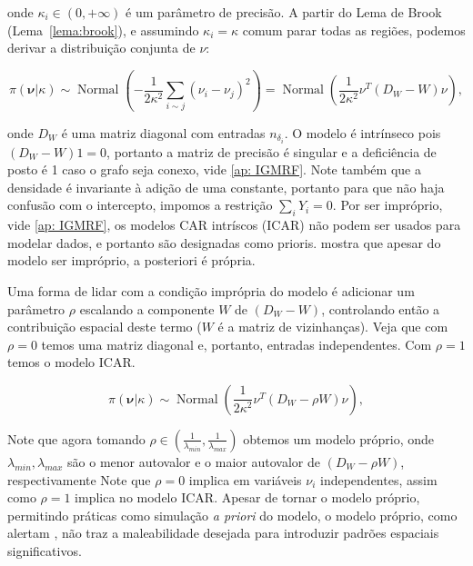 onde $\kappa_i \in (0,+\infty)$ é um parâmetro de precisão.
A partir do Lema de Brook (Lema~\autoref{lema:brook}), e assumindo $\kappa_i = \kappa$ comum parar todas as regiões, podemos derivar a distribuição conjunta de $\nu$:

\begin{equation}
\label{eq: full conditional}
    \pi(\boldsymbol{\nu}|\kappa) \sim \operatorname{Normal}\left(-\frac{1}{2\kappa^2} \sum_{i \sim j} (\nu_i - \nu_j)^2\right) = \operatorname{Normal}\left(\frac{1}{2\kappa^2} \nu^T (D_W - W)\nu \right),
\end{equation}

onde $D_W$ é uma matriz diagonal com entradas $n_{\delta_i}$.
O modelo é intrínseco pois $(D_W - W)1 = 0$, portanto a matriz de precisão é singular e a deficiência de posto é 1 caso o grafo seja conexo, vide \autoref{ap: IGMRF}.
Note também que a densidade é invariante à adição de uma constante, portanto para que não haja confusão com o intercepto, impomos a restrição $\sum_i Y_i = 0$.
Por ser impróprio, vide \autoref{ap: IGMRF}, os modelos CAR intríscos (ICAR) não podem ser usados para modelar dados, e portanto são designadas como prioris.
\cite{Besag1991} mostra que apesar do modelo ser impróprio, a posteriori é própria.

Uma forma de lidar com a condição imprópria do modelo é adicionar um parâmetro $\rho$ escalando a componente $W$  de $(D_W - W)$, controlando então a contribuição espacial deste termo ($W$ é a matriz de vizinhanças). Veja que com $\rho = 0$ temos uma matriz diagonal e, portanto, entradas independentes. Com $\rho = 1$ temos o modelo ICAR. 

\begin{equation}
    \pi(\boldsymbol{\nu}|\kappa) \sim \operatorname{Normal}\left(\frac{1}{2\kappa^2} \nu^T (D_W - \rho W)\nu \right),
\end{equation}

Note que agora tomando $\rho \in (\frac{1}{\lambda_{min}}, \frac{1}{\lambda_{max}})$ obtemos um modelo próprio, onde $\lambda_{min}, \lambda_{max}$ são o menor autovalor e o maior autovalor de $(D_W - \rho W)$, respectivamente
Note que $\rho = 0$ implica em variáveis $\nu_i$ independentes, assim como $\rho = 1$ implica no modelo ICAR.
Apesar de tornar o modelo próprio, permitindo práticas como simulação \textit{a priori} do modelo, o modelo próprio, como alertam \cite{Banerjee2015}, não traz a maleabilidade desejada para introduzir padrões espaciais significativos. 



